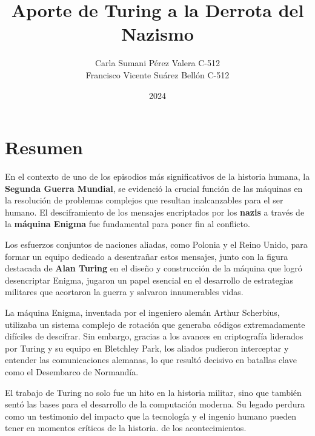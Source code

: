 \documentclass{article}
\begin{document}
\title{Aporte de Turing a la Derrota del Nazismo}
\author{Carla Sumani Pérez Valera C-512  \\ Francisco Vicente Suárez Bellón C-512}
\date{2024}

\maketitle

\pagebreak %

\tableofcontents %

\pagebreak %

\setcounter{section}{1}

\section*{Resumen}
En el contexto de uno de los episodios más significativos de la historia humana, 
la \textbf{Segunda Guerra Mundial}, se evidenció la crucial función de las máquinas 
en la resolución de problemas complejos que resultan inalcanzables para el ser humano. 
El desciframiento de los mensajes encriptados por los \textbf{nazis} a través de la 
\textbf{máquina Enigma} fue fundamental para poner fin al conflicto.

Los esfuerzos conjuntos de naciones aliadas, como Polonia y el Reino Unido, para formar 
un equipo dedicado a desentrañar estos mensajes, junto con la figura destacada de \textbf{Alan Turing} 
en el diseño y construcción de la máquina que logró desencriptar Enigma, jugaron un papel esencial en 
el desarrollo de estrategias militares que acortaron la guerra y salvaron innumerables vidas.

La máquina Enigma, inventada por el ingeniero alemán Arthur Scherbius, utilizaba un sistema 
complejo de rotación que generaba códigos extremadamente difíciles de descifrar. Sin embargo, 
gracias a los avances en criptografía liderados por Turing y su equipo en Bletchley Park, los 
aliados pudieron interceptar y entender las comunicaciones alemanas, lo que resultó decisivo 
en batallas clave como el Desembarco de Normandía.

El trabajo de Turing no solo fue un hito en la historia militar, sino que también sentó las 
bases para el desarrollo de la computación moderna. Su legado perdura como un testimonio del 
impacto que la tecnología y el ingenio humano pueden tener en momentos críticos de la historia.
de los acontecimientos.
\end{document}
